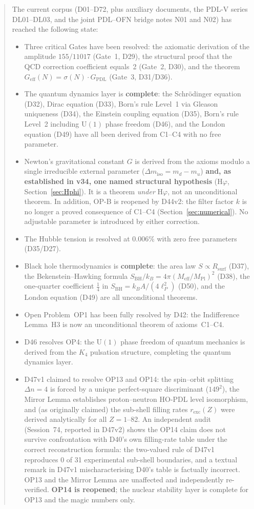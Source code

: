 \documentclass[11pt,a4paper]{article}
\theoremstyle{plain}
\theoremstyle{definition}
\theoremstyle{remark}
\newcommand{\Kfour}{K_4}
\newcommand{\Geff}{G_{\mathrm{eff}}}
\newcommand{\GPDL}{G_{\mathrm{PDL}}}
\newcommand{\Rsurf}{R_{\mathrm{surf}}}
\newcommand{\sigmaN}{\sigma(N)}
\newcommand{\SBH}{S_{\mathrm{BH}}}
\newcommand{\Meff}{M_{\mathrm{eff}}}
\newcommand{\MPl}{M_{\mathrm{Pl}}}
\begin{document}
\begin{abstract}
The current corpus (D01--D72, plus auxiliary documents, the PDL-V series DL01--DL03, and the joint PDL--OFN bridge notes N01 and N02) has reached the following state:
\begin{itemize}
\item Three critical Gates have been resolved: the axiomatic derivation of the amplitude $155/11017$ (Gate~1, D29), the structural proof that the QCD correction coefficient equals~2 (Gate~2, D30), and the theorem $\Geff(N)=\sigmaN\cdot\GPDL$ (Gate~3, D31/D36).
\item The quantum dynamics layer is \textbf{complete}: the Schr\"odinger equation (D32), Dirac equation (D33), Born's rule Level~1 via Gleason uniqueness (D34), the Einstein coupling equation (D35), Born's rule Level~2 including $\mathrm{U}(1)$ phase freedom (D46), and the London equation (D49) have all been derived from C1--C4 with no free parameter.
\item Newton's gravitational constant $G$ is derived from the axioms modulo a single irreducible external parameter ($\Delta m_{\mathrm{iso}} = m_d - m_u$) \textbf{and, as established in v34, one named structural hypothesis} (H$\varphi$, Section~\ref{sec:Hphi}). It is a theorem \emph{under} H$\varphi$, not an unconditional theorem. \textcolor{negativered}{In addition, OP-B is reopened by D44v2: the filter factor $k$ is no longer a proved consequence of C1--C4 (Section~\ref{sec:numerical}).} No adjustable parameter is introduced by either correction.
\item The Hubble tension is resolved at $0.006\%$ with zero free parameters (D35/D27).
\item Black hole thermodynamics is \textbf{complete}: the area law $S \propto \Rsurf$ (D37), the Bekenstein--Hawking formula $\SBH/k_B = 4\pi(\Meff/\MPl)^2$ (D38), the one-quarter coefficient $\tfrac{1}{4}$ in $\SBH = k_B A/(4\ell_P^2)$ (D50), and the London equation (D49) are all unconditional theorems.
\item Open Problem~OP1 has been fully resolved by D42: the Indifference Lemma~H3 is now an unconditional theorem of axioms~C1--C4.
\item D46 resolves OP4: the $\mathrm{U}(1)$ phase freedom of quantum mechanics is derived from the $\Kfour$ pulsation structure, completing the quantum dynamics layer.
\item D47v1 claimed to resolve OP13 and OP14: the spin--orbit splitting $\Delta n = 4$ is forced by a unique perfect-square discriminant ($149^2$), the Mirror Lemma establishes proton--neutron HO-PDL level isomorphism, and (as originally claimed) the sub-shell filling rates $r_{\mathrm{exc}}(Z)$ were derived analytically for all $Z = 1$--82. \textcolor{negativered}{An independent audit (Session~74, reported in D47v2) shows the OP14 claim does not survive confrontation with D40's own filling-rate table under the correct reconstruction formula: the two-valued rule of D47v1 reproduces 0 of 31 experimental sub-shell boundaries, and a textual remark in D47v1 mischaracterising D40's table is factually incorrect.} OP13 and the Mirror Lemma are unaffected and independently re-verified. \textbf{OP14 is reopened}; the nuclear stability layer is complete for OP13 and the magic numbers only.

\end{itemize}
\end{abstract}
\end{document}

